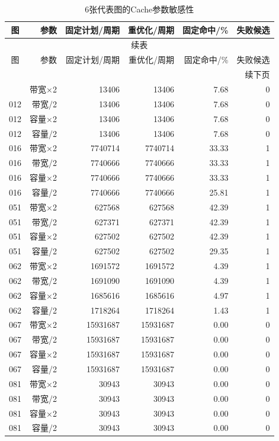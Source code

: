 \begin{longtable}{crrrrr}
\caption{6张代表图的Cache参数敏感性}\label{tab:sensitivity-detail}\\
\toprule
图 & 参数 & 固定计划/周期 & 重优化/周期 & 固定命中/\% & 失败候选 \\
\midrule
\endfirsthead
\multicolumn{6}{c}{续表}\\
\toprule
图 & 参数 & 固定计划/周期 & 重优化/周期 & 固定命中/\% & 失败候选 \\
\midrule
\endhead
\midrule\multicolumn{6}{r}{续下页}\\
\endfoot
\bottomrule
\endlastfoot
012 & 带宽×2 & 13406 & 13406 & 7.68 & 0 \\
012 & 带宽/2 & 13406 & 13406 & 7.68 & 0 \\
012 & 容量×2 & 13406 & 13406 & 7.68 & 0 \\
012 & 容量/2 & 13406 & 13406 & 7.68 & 0 \\
016 & 带宽×2 & 7740714 & 7740714 & 33.33 & 1 \\
016 & 带宽/2 & 7740666 & 7740666 & 33.33 & 1 \\
016 & 容量×2 & 7740666 & 7740666 & 33.33 & 1 \\
016 & 容量/2 & 7740666 & 7740666 & 25.81 & 1 \\
051 & 带宽×2 & 627568 & 627568 & 42.39 & 1 \\
051 & 带宽/2 & 627371 & 627371 & 42.39 & 1 \\
051 & 容量×2 & 627502 & 627502 & 42.39 & 1 \\
051 & 容量/2 & 627502 & 627502 & 29.35 & 1 \\
062 & 带宽×2 & 1691572 & 1691572 & 4.39 & 1 \\
062 & 带宽/2 & 1691090 & 1691090 & 4.39 & 1 \\
062 & 容量×2 & 1685616 & 1685616 & 4.97 & 1 \\
062 & 容量/2 & 1718264 & 1718264 & 1.43 & 1 \\
067 & 带宽×2 & 15931687 & 15931687 & 0.00 & 0 \\
067 & 带宽/2 & 15931687 & 15931687 & 0.00 & 0 \\
067 & 容量×2 & 15931687 & 15931687 & 0.00 & 0 \\
067 & 容量/2 & 15931687 & 15931687 & 0.00 & 0 \\
081 & 带宽×2 & 30943 & 30943 & 0.00 & 0 \\
081 & 带宽/2 & 30943 & 30943 & 0.00 & 0 \\
081 & 容量×2 & 30943 & 30943 & 0.00 & 0 \\
081 & 容量/2 & 30943 & 30943 & 0.00 & 0 \\
\end{longtable}
